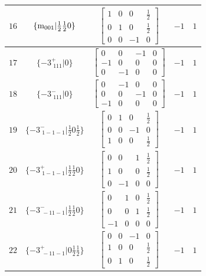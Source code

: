 \documentclass[fleqn,8pt]{jsarticle}
\begin{document}
\begin{longtable}{ccccc}
$ 16 $ & $ \{{\rm m}_{001}|\frac{1}{2} \frac{1}{2} 0\} $ & $ \begin{bmatrix} 1 & 0 & 0 & \frac{1}{2} \\ 0 & 1 & 0 & \frac{1}{2} \\ 0 & 0 & -1 & 0 \end{bmatrix} $ & $ -1 $ & $ 1 $ \\ \hline
$ 17 $ & $ \{-3^{+}_{\,\,111}|0\} $ & $ \begin{bmatrix} 0 & 0 & -1 & 0 \\ -1 & 0 & 0 & 0 \\ 0 & -1 & 0 & 0 \end{bmatrix} $ & $ -1 $ & $ 1 $ \\ \hline
$ 18 $ & $ \{-3^{-}_{\,\,111}|0\} $ & $ \begin{bmatrix} 0 & -1 & 0 & 0 \\ 0 & 0 & -1 & 0 \\ -1 & 0 & 0 & 0 \end{bmatrix} $ & $ -1 $ & $ 1 $ \\ \hline
$ 19 $ & $ \{-3^{-}_{\,\,1-1-1}|\frac{1}{2} 0 \frac{1}{2}\} $ & $ \begin{bmatrix} 0 & 1 & 0 & \frac{1}{2} \\ 0 & 0 & -1 & 0 \\ 1 & 0 & 0 & \frac{1}{2} \end{bmatrix} $ & $ -1 $ & $ 1 $ \\ \hline
$ 20 $ & $ \{-3^{+}_{\,\,1-1-1}|\frac{1}{2} \frac{1}{2} 0\} $ & $ \begin{bmatrix} 0 & 0 & 1 & \frac{1}{2} \\ 1 & 0 & 0 & \frac{1}{2} \\ 0 & -1 & 0 & 0 \end{bmatrix} $ & $ -1 $ & $ 1 $ \\ \hline
$ 21 $ & $ \{-3^{-}_{\,\,-11-1}|\frac{1}{2} \frac{1}{2} 0\} $ & $ \begin{bmatrix} 0 & 1 & 0 & \frac{1}{2} \\ 0 & 0 & 1 & \frac{1}{2} \\ -1 & 0 & 0 & 0 \end{bmatrix} $ & $ -1 $ & $ 1 $ \\ \hline
$ 22 $ & $ \{-3^{+}_{\,\,-11-1}|0 \frac{1}{2} \frac{1}{2}\} $ & $ \begin{bmatrix} 0 & 0 & -1 & 0 \\ 1 & 0 & 0 & \frac{1}{2} \\ 0 & 1 & 0 & \frac{1}{2} \end{bmatrix} $ & $ -1 $ & $ 1 $ \\ \hline

\end{longtable}
\end{document}
